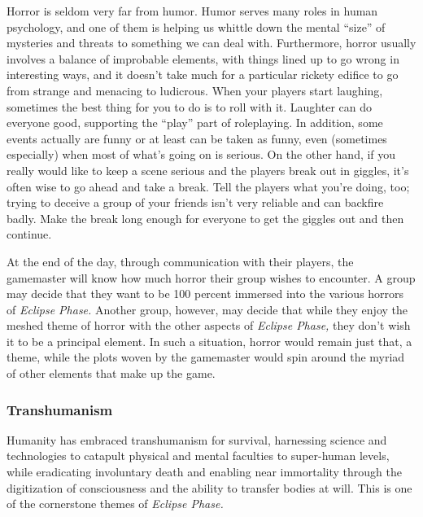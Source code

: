 Horror is seldom very far from humor. Humor serves many roles in human psychology, and one of them is helping us whittle down the mental ``size'' of mysteries and threats to something we can deal with. Furthermore, horror usually involves a balance of improbable elements, with things lined up to go wrong in interesting ways, and it doesn't take much for a particular rickety edifice to go from strange and menacing to ludicrous. When your players start laughing, sometimes the best thing for you to do is to roll with it. Laughter can do everyone good, supporting the ``play'' part of roleplaying. In addition, some events actually are funny or at least can be taken as funny, even (sometimes especially) when most of what's going on is serious. On the other hand, if you really would like to keep a scene serious and the players break out in giggles, it's often wise to go ahead and take a break. Tell the players what you're doing, too; trying to deceive a group of your friends isn't very reliable and can backfire badly. Make the break long enough for everyone to get the giggles out and then continue. 

At the end of the day, through communication with their players, the gamemaster will know how much horror their group wishes to encounter. A group may decide that they want to be 100 percent immersed into the various horrors of \textit{Eclipse Phase.} Another group, however, may decide that while they enjoy the meshed theme of horror with the other aspects of \textit{Eclipse Phase,} they don't wish it to be a principal element. In such a situation, horror would remain just that, a theme, while the plots woven by the gamemaster would spin around the myriad of other elements that make up the game. 

\subsubsection{Transhumanism} 

Humanity has embraced transhumanism for survival, harnessing science and technologies to catapult physical and mental faculties to super-human levels, while eradicating involuntary death and enabling near immortality through the digitization of consciousness and the ability to transfer bodies at will. This is one of the cornerstone themes of \textit{Eclipse Phase.} 


